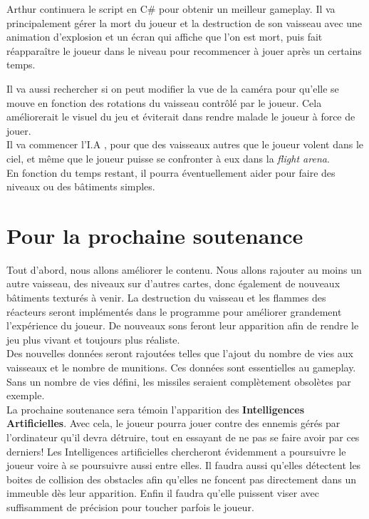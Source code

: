 \documentclass[10pt, titlepage]{report}
\begin{document}
Arthur continuera le script en C\# pour obtenir un meilleur gameplay. Il va principalement gérer la mort du joueur et la destruction de son vaisseau avec une animation d'explosion  et un écran qui affiche que l'on est mort, puis fait réapparaître le joueur dans le niveau pour recommencer à jouer après un certains temps.

 Il va aussi rechercher si on peut modifier la vue de la caméra pour qu'elle se mouve en fonction des rotations du vaisseau contrôlé par le joueur. Cela améliorerait le visuel du jeu et éviterait dans rendre malade le joueur à force de jouer.\\

Il va commencer l'I.A , pour que des vaisseaux autres que le joueur volent dans le ciel, et même que le joueur puisse se confronter à eux dans la \textit{flight arena}.\\

En fonction du temps restant, il pourra éventuellement aider pour faire des niveaux ou des bâtiments simples.

\chapter{Pour la prochaine soutenance}

Tout d'abord, nous allons améliorer le contenu. Nous allons rajouter au moins un autre vaisseau, des niveaux sur d'autres cartes, donc également de nouveaux bâtiments texturés à venir. La destruction du vaisseau et les flammes des réacteurs seront implémentés dans le programme pour améliorer grandement l'expérience du joueur. De nouveaux sons feront leur apparition afin de rendre le jeu plus vivant et toujours plus réaliste.\\

Des nouvelles données seront rajoutées telles que l'ajout du nombre de vies aux vaisseaux et le nombre de munitions. Ces données sont essentielles au gameplay. Sans un nombre de vies défini, les missiles seraient complètement obsolètes par exemple.\\

La prochaine soutenance sera témoin l'apparition des \textbf{Intelligences Artificielles}. Avec cela, le joueur pourra jouer contre des ennemis gérés par l'ordinateur qu'il devra détruire, tout en essayant de ne pas se faire avoir par ces derniers! Les Intelligences artificielles chercheront évidemment a poursuivre le joueur voire à se poursuivre aussi entre elles. Il faudra aussi qu'elles détectent les boites de collision des obstacles afin qu'elles ne foncent pas directement dans un immeuble dès leur apparition. Enfin il faudra qu'elle puissent viser avec suffisamment de précision pour toucher parfois le joueur. \\
\end{document}

